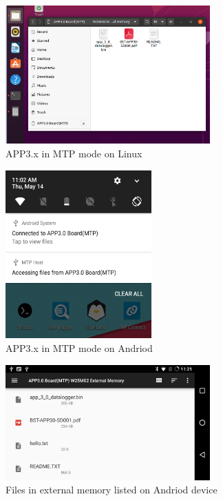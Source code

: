 \documentclass[11pt,headings=small]{scrartcl}
\begin{document}
\begin{figure}[H]
	\begin{center}
		\includegraphics[width=0.7\textwidth]{coinesAPI_images/MTP_Ubuntu_Nautilus.png}
		\caption{APP3.x in MTP mode on Linux}
	\end{center}
\end{figure}

\begin{figure}[H]
	\begin{center}
		\includegraphics[width=0.5\textwidth]{coinesAPI_images/MTP_Android_2.png}
		\caption{APP3.x in MTP mode on Andriod}
	\end{center}
\end{figure}

\begin{figure}[H]
	\begin{center}
		\includegraphics[width=0.7\textwidth]{coinesAPI_images/MTP_Android_3.png}
		\caption{Files in external memory listed on Andriod device}
	\end{center}
\end{figure}
\end{document}
